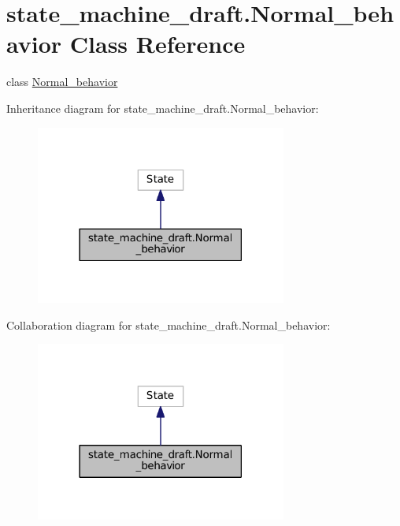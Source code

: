 \hypertarget{classstate__machine__draft_1_1Normal__behavior}{}\section{state\+\_\+machine\+\_\+draft.\+Normal\+\_\+behavior Class Reference}
\label{classstate__machine__draft_1_1Normal__behavior}


class \hyperlink{classstate__machine__draft_1_1Normal__behavior}{Normal\+\_\+behavior}  




Inheritance diagram for state\+\_\+machine\+\_\+draft.\+Normal\+\_\+behavior\+:\nopagebreak
\begin{figure}[H]
\begin{center}
\leavevmode
\includegraphics[width=234pt]{classstate__machine__draft_1_1Normal__behavior__inherit__graph}
\end{center}
\end{figure}


Collaboration diagram for state\+\_\+machine\+\_\+draft.\+Normal\+\_\+behavior\+:\nopagebreak
\begin{figure}[H]
\begin{center}
\leavevmode
\includegraphics[width=234pt]{classstate__machine__draft_1_1Normal__behavior__coll__graph}
\end{center}
\end{figure}
